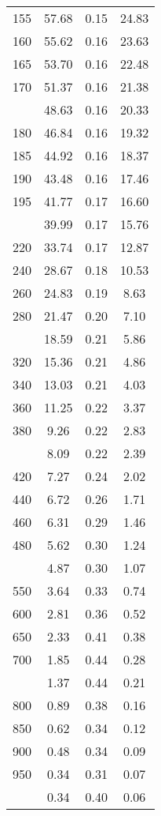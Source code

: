 \begin{table}[ht]
\begin{tabular}{lccc}
  155 & 57.68 & 0.15 & 24.83 \\ 
  160 & 55.62 & 0.16 & 23.63 \\ 
  165 & 53.70 & 0.16 & 22.48 \\ 
  170 & 51.37 & 0.16 & 21.38 \\ 
   \addlinespace
175 & 48.63 & 0.16 & 20.33 \\ 
  180 & 46.84 & 0.16 & 19.32 \\ 
  185 & 44.92 & 0.16 & 18.37 \\ 
  190 & 43.48 & 0.16 & 17.46 \\ 
  195 & 41.77 & 0.17 & 16.60 \\ 
   \addlinespace
200 & 39.99 & 0.17 & 15.76 \\ 
  220 & 33.74 & 0.17 & 12.87 \\ 
  240 & 28.67 & 0.18 & 10.53 \\ 
  260 & 24.83 & 0.19 & 8.63 \\ 
  280 & 21.47 & 0.20 & 7.10 \\ 
   \addlinespace
300 & 18.59 & 0.21 & 5.86 \\ 
  320 & 15.36 & 0.21 & 4.86 \\ 
  340 & 13.03 & 0.21 & 4.03 \\ 
  360 & 11.25 & 0.22 & 3.37 \\ 
  380 & 9.26 & 0.22 & 2.83 \\ 
   \addlinespace
400 & 8.09 & 0.22 & 2.39 \\ 
  420 & 7.27 & 0.24 & 2.02 \\ 
  440 & 6.72 & 0.26 & 1.71 \\ 
  460 & 6.31 & 0.29 & 1.46 \\ 
  480 & 5.62 & 0.30 & 1.24 \\ 
   \addlinespace
500 & 4.87 & 0.30 & 1.07 \\ 
  550 & 3.64 & 0.33 & 0.74 \\ 
  600 & 2.81 & 0.36 & 0.52 \\ 
  650 & 2.33 & 0.41 & 0.38 \\ 
  700 & 1.85 & 0.44 & 0.28 \\ 
   \addlinespace
750 & 1.37 & 0.44 & 0.21 \\ 
  800 & 0.89 & 0.38 & 0.16 \\ 
  850 & 0.62 & 0.34 & 0.12 \\ 
  900 & 0.48 & 0.34 & 0.09 \\ 
  950 & 0.34 & 0.31 & 0.07 \\ 
   \addlinespace
1000 & 0.34 & 0.40 & 0.06 \\ 
   \bottomrule
\end{tabular}
\end{table}
